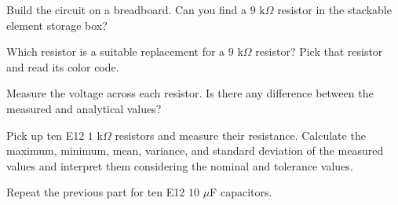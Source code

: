 \documentclass[11pt]{article}
\begin{document}
\begin{question}
\begin{subquestion}{Build the circuit on a breadboard. Can you find a $9$ k$\Omega$ resistor in the stackable element storage box? } 
\answer{}
\end{subquestion}

\begin{subquestion}{Which resistor is a suitable replacement for a $9$ k$\Omega$ resistor? Pick that resistor and read its color code.} 
\answer{}
\end{subquestion}

\begin{subquestion}{Measure the voltage across each resistor. Is there any difference between the measured and analytical values?} 
\answer{}
\end{subquestion}

\end{question}



\begin{question}


\begin{subquestion}{Pick up ten E12 $1$ k$\Omega$ resistors and measure their resistance. Calculate the maximum, minimum, mean, variance, and standard deviation of the measured values and interpret them considering the nominal and tolerance values. } 
\answer{}
\end{subquestion}

\begin{subquestion}{Repeat the previous part for ten E12 $10$ $\mu$F capacitors. } 
\answer{}
\end{subquestion}

\end{question}

\end{document}
